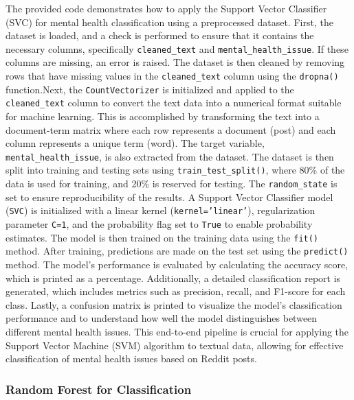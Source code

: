 \noindent
The provided code demonstrates how to apply the Support Vector Classifier (SVC) for mental health classification using a preprocessed dataset. First, the dataset is loaded, and a check is performed to ensure that it contains the necessary columns, specifically \texttt{cleaned\_text} and \texttt{mental\_health\_issue}. If these columns are missing, an error is raised. The dataset is then cleaned by removing rows that have missing values in the \texttt{cleaned\_text} column using the \texttt{dropna()} function.Next, the \texttt{CountVectorizer} is initialized and applied to the \texttt{cleaned\_text} column to convert the text data into a numerical format suitable for machine learning. This is accomplished by transforming the text into a document-term matrix where each row represents a document (post) and each column represents a unique term (word). The target variable, \texttt{mental\_health\_issue}, is also extracted from the dataset. The dataset is then split into training and testing sets using \texttt{train\_test\_split()}, where 80\% of the data is used for training, and 20\% is reserved for testing. The \texttt{random\_state} is set to ensure reproducibility of the results. A Support Vector Classifier model (\texttt{SVC}) is initialized with a linear kernel (\texttt{kernel='linear'}), regularization parameter \texttt{C=1}, and the probability flag set to \texttt{True} to enable probability estimates. The model is then trained on the training data using the \texttt{fit()} method. After training, predictions are made on the test set using the \texttt{predict()} method. The model's performance is evaluated by calculating the accuracy score, which is printed as a percentage. Additionally, a detailed classification report is generated, which includes metrics such as precision, recall, and F1-score for each class. Lastly, a confusion matrix is printed to visualize the model's classification performance and to understand how well the model distinguishes between different mental health issues. This end-to-end pipeline is crucial for applying the Support Vector Machine (SVM) algorithm to textual data, allowing for effective classification of mental health issues based on Reddit posts.


\subsubsection{Random Forest for Classification}


